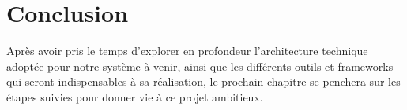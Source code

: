 \newpage
\section*{Conclusion}

\hspace{\parindent}Après avoir pris le temps d'explorer en profondeur l'architecture technique adoptée pour notre système à venir, ainsi que les différents outils et frameworks qui seront indispensables à sa réalisation, le prochain chapitre se penchera sur les étapes suivies pour donner vie à ce projet ambitieux.

\pagebreak